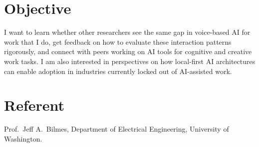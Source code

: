 \documentclass[manuscript,anonymous=false]{acmart}
\begin{document}
\section*{Objective}

I want to learn whether other researchers see the same gap in voice-based AI for work that I do, get feedback on how to evaluate these interaction patterns rigorously, and connect with peers working on AI tools for cognitive and creative work tasks. I am also interested in perspectives on how local-first AI architectures can enable adoption in industries currently locked out of AI-assisted work.

\section*{Referent}

Prof.\ Jeff A.\ Bilmes, Department of Electrical Engineering, University of Washington.
\end{document}
